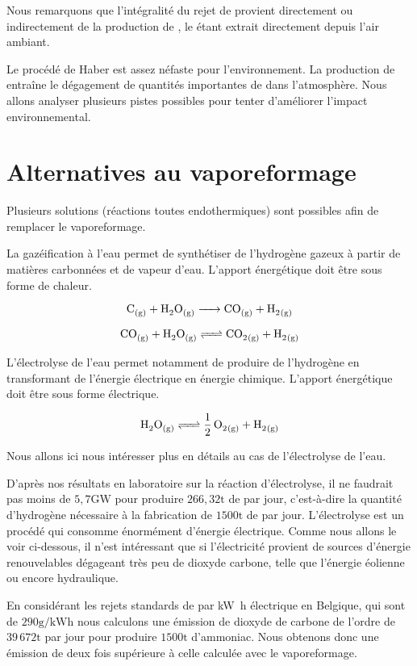 \documentclass[a4paper, oneside, 12pt]{article}
\begin{document}
Nous remarquons que l'intégralité du rejet de  provient directement 
ou indirectement de la production de , le  étant extrait 
directement depuis l'air ambiant.

Le procédé de Haber est assez néfaste pour l'environnement. 
La production de  entraîne le dégagement de quantités 
importantes de  dans l'atmosphère.
Nous allons analyser plusieurs pistes possibles pour tenter 
d'améliorer l'impact environnemental.

\section*{Alternatives au vaporeformage}

Plusieurs solutions (réactions toutes endothermiques) 
sont possibles afin de remplacer le vaporeformage.

La gazéification à l'eau permet de synthétiser de l'hydrogène 
gazeux à partir de matières carbonnées et de vapeur d'eau.
L'apport énergétique doit être sous forme de chaleur. %

\[ \ce{C_{(g)} + H2O_{(g)} -> CO_{(g)} + H2_{(g)}} \]

\[ \ce{CO_{(g)} + H2O_{(g)} <=> CO2_{(g)} + H2_{(g)}} \]

L'électrolyse de l'eau permet notamment de produire de l'hydrogène 
en transformant de l'énergie électrique en énergie chimique.
L'apport énergétique doit être sous forme électrique.

\[ \ce{H2O_{(g)} <=> \frac{1}{2} \, O2_{(g)} + H2_{(g)}} \]

Nous allons ici nous intéresser plus en détails au cas de l'électrolyse de l'eau. 

D'après nos résultats en laboratoire sur la réaction d'électrolyse, 
il ne faudrait pas moins de $5,7 \si{\giga\watt}$ 
pour produire $266,32\si{\tonne}$ de  par jour, 
c'est-à-dire la quantité d'hydrogène nécessaire 
à la fabrication de $1500\si{\tonne}$ de  par jour. 
L'électrolyse est un procédé qui consomme énormément d'énergie électrique. 
Comme nous allons le voir ci-dessous, il n'est intéressant que si 
l'électricité provient de sources d'énergie renouvelables dégageant 
très peu de dioxyde carbone, telle que l'énergie éolienne ou encore hydraulique.

En considérant les rejets standards de  par \si{\kilo\watt\hour} électrique 
en Belgique, qui sont de $290\si{\gram/\kilo\watt\hour}$ %
nous calculons une émission de dioxyde de carbone de l'ordre de $39 \, 672\si{\tonne}$
par jour pour produire $1500\si{\tonne}$ d'ammoniac. 
Nous obtenons donc une émission de  deux fois 
supérieure à celle calculée avec le vaporeformage.
\end{document}
